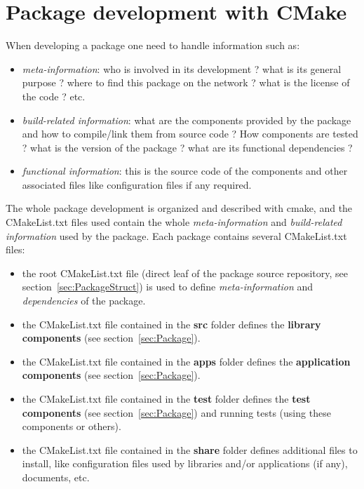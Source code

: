 \documentclass[12pt,a4paper]{article}
\begin{document}
\pagebreak

\section{Package development with CMake}
\label{sec:useCMake}

When developing a package one need to handle information such as:
\begin{itemize}
\item \textit{meta-information}: who is involved in its development ? what is its general purpose ? where to find this package on the network ? what is the license of the code ? etc.
\item \textit{build-related information}: what are the components provided by the package and how to compile/link them from source code ?  How components are tested ? what is the version of the package ? what are its functional dependencies ?
\item \textit{functional information}: this is the source code of the components and other associated files like configuration files if any required.
\end{itemize}

The whole package development is organized and described with cmake, and the CMakeList.txt files used contain the whole \textit{meta-information} and \textit{build-related information} used by the package. Each package contains several CMakeList.txt files:
\begin{itemize}
\item the root CMakeList.txt file (direct leaf of the package source repository, see section~\ref{sec:PackageStruct}) is used to define \textit{meta-information} and \textit{dependencies} of the package.
\item the CMakeList.txt file contained in the \textbf{src} folder defines the \textbf{library components} (see section~\ref{sec:Package}).
\item the CMakeList.txt file contained in the \textbf{apps} folder defines the \textbf{application components} (see section~\ref{sec:Package}).
\item the CMakeList.txt file contained in the \textbf{test} folder defines the \textbf{test components} (see section~\ref{sec:Package}) and running tests (using these components or others).
\item the CMakeList.txt file contained in the \textbf{share} folder defines additional files to install, like configuration files used by libraries and/or applications (if any), documents, etc.
\end{itemize}
\end{document}
